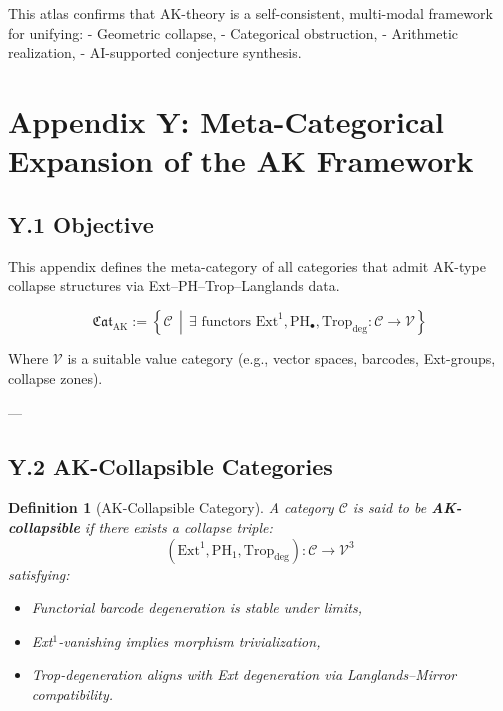 \documentclass[11pt]{article}
\newtheorem{definition}[theorem]{Definition}
\begin{document}
This atlas confirms that AK-theory is a self-consistent, multi-modal framework for unifying:
- Geometric collapse,
- Categorical obstruction,
- Arithmetic realization,
- AI-supported conjecture synthesis.


\section*{Appendix Y: Meta-Categorical Expansion of the AK Framework}

\subsection*{Y.1 Objective}

This appendix defines the meta-category of all categories  
that admit AK-type collapse structures via Ext–PH–Trop–Langlands data.

\[
\boxed{
\mathfrak{Cat}_{\mathrm{AK}} := 
\left\{
  \mathcal{C} \,\middle|\,
  \exists \text{ functors } \mathrm{Ext}^1, \mathrm{PH}_\bullet, \mathrm{Trop}_{\mathrm{deg}} : \mathcal{C} \to \mathcal{V}
\right\}
}
\]

Where \( \mathcal{V} \) is a suitable value category (e.g., vector spaces, barcodes, Ext-groups, collapse zones).

---

\subsection*{Y.2 AK-Collapsible Categories}

\begin{definition}[AK-Collapsible Category]
A category \( \mathcal{C} \) is said to be \textbf{AK-collapsible} if there exists a collapse triple:
\[
(\mathrm{Ext}^1, \mathrm{PH}_1, \mathrm{Trop}_{\mathrm{deg}}): \mathcal{C} \to \mathcal{V}^3
\]
satisfying:
\begin{itemize}
  \item Functorial barcode degeneration is stable under limits,
  \item Ext$^1$-vanishing implies morphism trivialization,
  \item Trop-degeneration aligns with Ext degeneration via Langlands–Mirror compatibility.
\end{itemize}
\end{definition}
\end{document}
